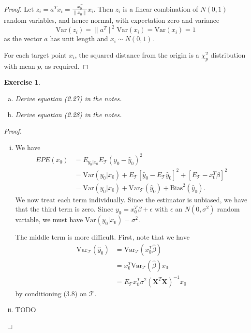 \documentclass[12pt]{amsart}
\theoremstyle{plain}%
\newtheorem{exer}[thm]{Exercise}
\theoremstyle{definition}
\theoremstyle{remark}
\begin{document}
\begin{proof}
    Let $z_i = a^T x_i = \frac{x_0^T}{\| x_0 \|} x_i$.  Then $z_i$ is a linear combination of $N(0,1)$ random variables, and hence normal, with expectation zero and variance \[ 
        \text{Var}(z_i) = \| a^T \|^2 \text{Var}(x_i) = \text{Var}(x_i) = 1
    \] as the vector $a$ has unit length and $x_i \sim N(0, 1)$.
    
    For each target point $x_i$, the squared distance from the origin is a $\chi^2_p$ distribution with mean $p$, as required.  
\end{proof}

\begin{exer}
    \begin{enumerate}[(a)]
        \item Derive equation (2.27) in the notes.
        \item Derive equation (2.28) in the notes.
    \end{enumerate}
\end{exer}

\begin{proof}
    \begin{enumerate}[(i)]
        \item We have \begin{align*}
            EPE(x_0) &= E_{y_0 | x_0} E_{\mathcal{T}}(y_0 - \hat y_0)^2 \\
                     &= \text{Var}(y_0|x_0) + E_{\mathcal T}[\hat y_0 - E_{\mathcal T} \hat y_0]^2 + [E_{\mathcal T} - x_0^T \beta]^2 \\
                     &= \text{Var}(y_0 | x_0) + \text{Var}_\mathcal{T}(\hat y_0) + \text{Bias}^2(\hat y_0).
        \end{align*}  We now treat each term individually.  Since the estimator is unbiased, we have that the third term is zero.  Since $y_0 = x_0^T \beta + \epsilon$ with $\epsilon$ an $N(0,\sigma^2)$ random variable, we must have $\text{Var}(y_0|x_0) = \sigma^2$.  

        The middle term is more difficult.  First, note that we have \begin{align*}
            \text{Var}_{\mathcal T}(\hat y_0) &= \text{Var}_{\mathcal T}(x_0^T \hat \beta) \\
                    &= x_0^T \text{Var}_{\mathcal T}(\hat \beta) x_0 \\
                    &= E_{\mathcal T} x_0^T \sigma^2 (\mathbf{X}^T \mathbf{X})^{-1} x_0
            \end{align*} by conditioning (3.8) on $\mathcal T$.
        \item TODO
    \end{enumerate}
\end{proof}
\end{document}
